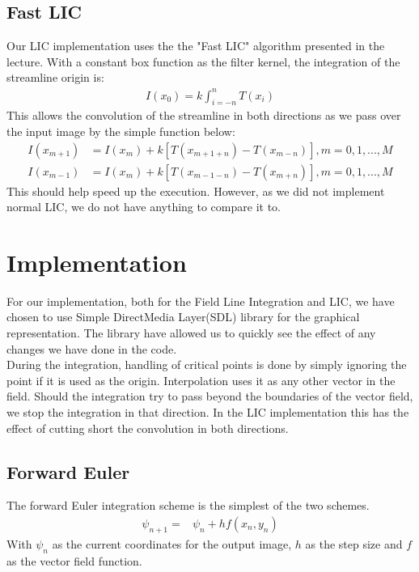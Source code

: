 \documentclass[11pt,a4paper,english]{article}
\numberwithin{equation}{section}
\begin{document}
\subsection{Fast LIC}
Our LIC implementation uses the the "Fast LIC" algorithm presented in the lecture. With a constant box function as the filter kernel, the integration of the streamline origin is: \\
\begin{align*}
	I(x_0) = k \int^{n}_{i = -n}T(x_i)
\end{align*}
This allows the convolution of the streamline in both directions as we pass over the input image by the simple function below:
\begin{align*}
	I(x_{m+1}) &= I(x_m) + k[T(x_{m+1+n}) - T(x_{m-n})], m = 0, 1,..., M	\\
	I(x_{m-1}) &= I(x_m) + k[T(x_{m-1-n}) - T(x_{m+n})], m = 0, 1,..., M
\end{align*}
This should help speed up the execution. However, as we did not implement normal LIC, we do not have anything to compare it to.

\section{Implementation}
For our implementation, both for the Field Line Integration and LIC, we have chosen to use Simple DirectMedia Layer(SDL) library for the graphical representation. The library have allowed us to quickly see the effect of any changes we have done in the code.
\\
During the integration, handling of critical points is done by simply ignoring the point if it is used as the origin. Interpolation uses it as any other vector in the field.
Should the integration try to pass beyond the boundaries of the vector field, we stop the integration in that direction. In the LIC implementation this has the effect of cutting short the convolution in both directions.

\subsection{Forward Euler}
The forward Euler integration scheme is the simplest of the two schemes. 
\begin{align*}
	\psi_{n+1} =& \psi_n + hf(x_n, y_n)
\end{align*}
With $\psi_n$ as the current coordinates for the output image, $h$ as the step size and $f$ as the vector field function.
\end{document}

